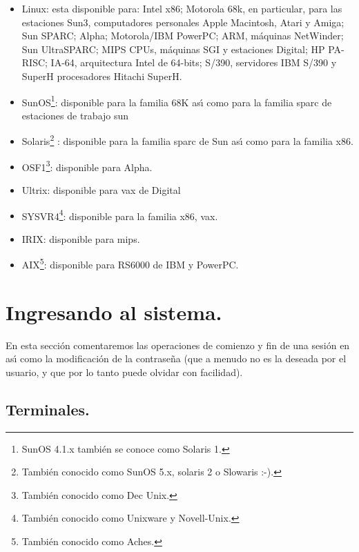\begin{itemize}
  
\item Linux: esta disponible para: Intel x86; Motorola 68k, en
  particular, para las estaciones Sun3, computadores personales Apple
  Macintosh, Atari y Amiga; Sun SPARC; Alpha; Motorola/IBM PowerPC;
  ARM, m{\'a}quinas NetWinder; Sun UltraSPARC; MIPS CPUs, m{\'a}quinas SGI y
  estaciones Digital; HP PA-RISC; IA-64, arquitectura Intel de
  64-bits; S/390, servidores IBM S/390 y SuperH procesadores Hitachi
  SuperH.

\item SunOS\footnote{SunOS 4.1.x tambi{\'e}n se conoce como Solaris 1.}:
  disponible para la familia 68K as{\'\i} como para la familia {\sc sparc}
  de estaciones de trabajo {\sc sun}
  
\item Solaris\footnote{Tambi{\'e}n conocido como SunOS 5.x, solaris 2 o
    Slowaris :-).} : disponible para la familia {\sc sparc} de {\sc
    Sun} as{\'\i} como para la familia x86.

\item OSF1\footnote{Tambi{\'e}n conocido como Dec Unix.}: disponible para Alpha.
  
\item Ultrix: disponible para {\sc vax} de Digital  
  
\item SYSVR4\footnote{Tambi\'en conocido como Unixware y Novell-Unix.}:
  disponible para la familia x86, vax.

\item IRIX: disponible para {\sc mips}.
  
\item AIX\footnote{Tambi{\'e}n conocido como Aches.}: disponible para
  RS6000 de IBM y PowerPC.

\end{itemize}

\section{Ingresando al sistema.}

En esta secci{\'o}n comentaremos las operaciones de comienzo y fin de una
sesi{\'o}n en {\unix} as{\'\i} como la modificaci{\'o}n de la contrase{\~n}a (que a
menudo no es la deseada por el usuario, y que por lo tanto puede
olvidar con facilidad).

\subsection{Terminales.}

